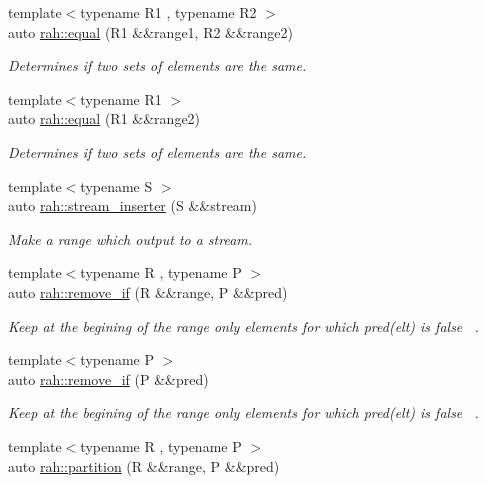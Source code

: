 \begin{DoxyCompactItemize}
{\footnotesize template$<$typename R1 , typename R2 $>$ }\\auto \mbox{\hyperlink{namespacerah_abf321dffb33d6a2d752aa091fdba7bbf}{rah\+::equal}} (R1 \&\&range1, R2 \&\&range2)
\begin{DoxyCompactList}\small\item\em Determines if two sets of elements are the same. \end{DoxyCompactList}\item 
{\footnotesize template$<$typename R1 $>$ }\\auto \mbox{\hyperlink{namespacerah_a3434aacc26937d3ff50b5db4286feda6}{rah\+::equal}} (R1 \&\&range2)
\begin{DoxyCompactList}\small\item\em Determines if two sets of elements are the same. \end{DoxyCompactList}\item 
{\footnotesize template$<$typename S $>$ }\\auto \mbox{\hyperlink{namespacerah_a3f7b590b1bd8a44b5b2d6f4e35f1837c}{rah\+::stream\+\_\+inserter}} (S \&\&stream)
\begin{DoxyCompactList}\small\item\em Make a range which output to a stream. \end{DoxyCompactList}\item 
{\footnotesize template$<$typename R , typename P $>$ }\\auto \mbox{\hyperlink{namespacerah_afba9495316f20f6caee735c15feb349c}{rah\+::remove\+\_\+if}} (R \&\&range, P \&\&pred)
\begin{DoxyCompactList}\small\item\em Keep at the begining of the range only elements for which pred(elt) is false~\newline
. \end{DoxyCompactList}\item 
{\footnotesize template$<$typename P $>$ }\\auto \mbox{\hyperlink{namespacerah_af598cf91c554f6d6938c320578e6bb02}{rah\+::remove\+\_\+if}} (P \&\&pred)
\begin{DoxyCompactList}\small\item\em Keep at the begining of the range only elements for which pred(elt) is false~\newline
. \end{DoxyCompactList}\item 
{\footnotesize template$<$typename R , typename P $>$ }\\auto \mbox{\hyperlink{namespacerah_a97ae3ed90fe486c2dd3a90fee811bcd7}{rah\+::partition}} (R \&\&range, P \&\&pred)

\end{DoxyCompactItemize}
